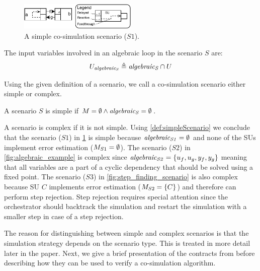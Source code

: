 \begin{figure}
  \includegraphics[width=0.5\textwidth]{images/simple_example.pdf}
  \caption{A simple co-simulation scenario ($S1$).}
  \label{fig:simpleexample}  
\end{figure}

The input variables involved in an algebraic loop in the scenario $S$ are:
\begin{align}
  U_{\mathit{algebraic_{S}}} \triangleq \mathit{algebraic_{S}} \cap U
\end{align}

Using the given definition of a scenario, we call a co-simulation scenario either simple or complex.
\begin{definition}\label{def:simpleScenario}
  A scenario $S$ is simple if $M = \emptyset \land \mathit{algebraic_{S}} = \emptyset$.
\end{definition}

A scenario is complex if it is not simple. Using \cref{def:simpleScenario} we conclude that the scenario ($S1$) in \cref{fig:simpleexample} is simple because $\mathit{algebraic_{S1}}=\emptyset$ and none of the SUs implement error estimation ($M_{S1}=\emptyset$). The scenario ($S2$) in \cref{fig:algebraic_example} is complex since $\mathit{algebraic_{S2}}=\{u_{f}, u_{g}, y_{f}, y_{g}\}$ meaning that all variables are a part of a cyclic dependency that should be solved using a fixed point.
The scenario ($S3$) in \cref{fig:step_finding_scenario} is also complex because SU $C$ implements error estimation ($M_{S2}=\{C\}$) and therefore can perform step rejection. Step rejection requires special attention since the orchestrator should backtrack the simulation and restart the simulation with a smaller step in case of a step rejection.

The reason for distinguishing between simple and complex scenarios is that the simulation strategy depends on the scenario type. This is treated in more detail later in the paper.
Next, we give a brief presentation of the contracts from \cite{Gomes2019a} before describing how they can be used to verify a co-simulation algorithm.

